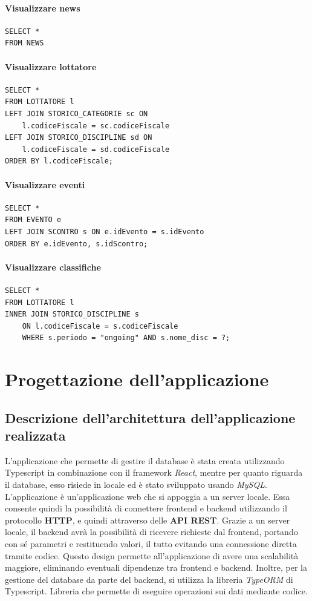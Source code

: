 \documentclass[a4paper,12pt]{report}
\begin{document}
\subsubsection{Visualizzare news}
\begin{verbatim}
SELECT *
FROM NEWS
\end{verbatim}
\subsubsection{Visualizzare lottatore}
\begin{verbatim}
SELECT *
FROM LOTTATORE l
LEFT JOIN STORICO_CATEGORIE sc ON 
    l.codiceFiscale = sc.codiceFiscale
LEFT JOIN STORICO_DISCIPLINE sd ON 
    l.codiceFiscale = sd.codiceFiscale
ORDER BY l.codiceFiscale;    
\end{verbatim}
\subsubsection{Visualizzare eventi}
\begin{verbatim}
SELECT *
FROM EVENTO e
LEFT JOIN SCONTRO s ON e.idEvento = s.idEvento
ORDER BY e.idEvento, s.idScontro;
\end{verbatim}
\subsubsection{Visualizzare classifiche}
\begin{verbatim}
SELECT *
FROM LOTTATORE l
INNER JOIN STORICO_DISCIPLINE s
    ON l.codiceFiscale = s.codiceFiscale
    WHERE s.periodo = "ongoing" AND s.nome_disc = ?;
\end{verbatim}

\chapter{Progettazione dell'applicazione}
\section{Descrizione dell'architettura dell'applicazione realizzata}
L'applicazione che permette di gestire il database è stata creata utilizzando \textrm{Typescript} in combinazione con il framework 
\emph{React}, mentre per quanto riguarda il database, esso risiede in locale ed è stato sviluppato usando \emph{MySQL}.
L'applicazione è un'applicazione web che si appoggia a un server locale. Essa consente quindi la possibilità di connettere 
frontend e backend utilizzando il protocollo \textbf{HTTP}, e quindi attraverso delle \textbf{API REST}. Grazie a un server locale, 
il backend avrà la possibilità di ricevere richieste dal frontend, portando con sé parametri e restituendo valori, il tutto 
evitando una connessione diretta tramite codice. Questo design permette all'applicazione di avere una scalabilità maggiore, eliminando 
eventuali dipendenze tra frontend e backend. Inoltre, per la gestione del database da parte del backend, si utilizza la libreria 
\emph{TypeORM} di \textrm{Typescript}. Libreria che permette di eseguire operazioni sui dati mediante codice.
\end{document}
